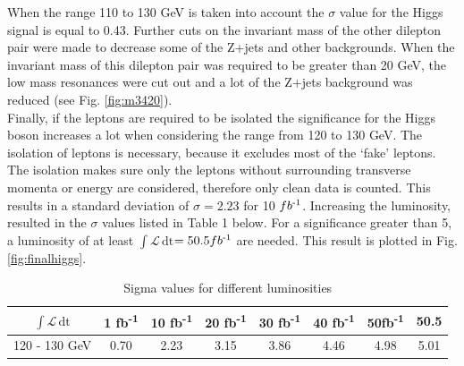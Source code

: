 \documentclass[runningheads,a4paper]{llncs}
\newcommand{\invfb}{fb\textsuperscript{-1}}
\newcommand{\lumi}{$\int \mathcal{L} \, \mathrm{dt}$}
\begin{document}
When the range 110 to 130 GeV is taken into account the $\sigma$ value for the Higgs signal is equal to 0.43. Further cuts on the invariant mass of the other dilepton pair were made to decrease some of the Z+jets and other backgrounds. When the invariant mass of this dilepton pair was required to be greater than 20 GeV, the low mass resonances were cut out and a lot of the Z+jets background was reduced (see Fig. \ref{fig:m3420}).\\

Finally, if the leptons are required to be isolated the significance for the Higgs boson increases a lot when considering the range from 120 to 130 GeV. The isolation of leptons is necessary, because it excludes most of the ‘fake’ leptons. The isolation makes sure only the leptons without surrounding transverse momenta or energy are considered, therefore only clean data is counted. This results in a standard deviation of $\sigma = 2.23$ for 10 $\invfb$. Increasing the luminosity, resulted in the $\sigma$ values listed in Table 1 below. For a significance greater than 5, a luminosity of at least \lumi $= 50.5 \invfb$ are needed. This result is plotted in Fig. \ref{fig:finalhiggs}.
\begin{table}[h]
\centering
\caption{Sigma values for different luminosities}
\label{my-label}
\begin{tabular}{|c|c|c|c|c|c|c|c}
\hline
\lumi           & 1 \invfb & 10 \invfb & 20 \invfb & 30 \invfb & 40 \invfb & 50\invfb & 50.5 \\ \hline
120 - 130 GeV & 0.70     &   2.23       &     3.15      &       3.86    &     4.46      &      4.98	&	5.01     \\ \hline
\end{tabular}
\end{table}
\end{document}

